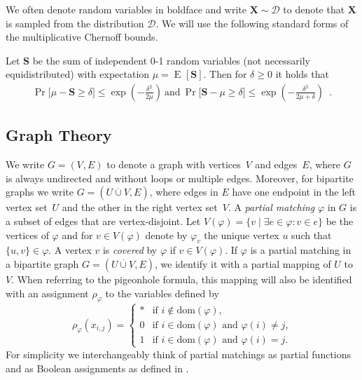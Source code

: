 \documentclass{theoretics}
\DeclareMathOperator{\Expop}{E}
\newcommand{\Prob}[2][]{\Pr_{#1} \bigl[ #2 \bigr]}
\newcommand{\expectation}[2][]{\Expop_{#1} [ #2 ]}
\newcommand{\domainof}[1]{\ensuremath{\mathrm{dom} ( #1 )}}
\newcommand{\set}[1]{\{ #1 \}}
\newcommand{\setdescr}[3][\mid]{\set{ #2 #1 #3 }}
\newcommand{\disjointunion}{\overset{.}{\cup}}
\newcommand{\introduceterm}[1]{{\emph{#1}}}
\newcommand{\eqperiod}{\enspace .}
\newcommand{\V}[1][]{V_{#1}}
\newcommand{\matchbool}[1]{\rho_{#1}}
\newcommand{\matchboolof}[2]{\rho_{#1}(#2)}
\newcommand{\matcha}{\varphi}
\newcommand{\matchaof}[1]{\matcha(#1)}
\newcommand{\Xrand}{\boldsymbol{X}}
\newcommand{\sample}[2]{#1\sim#2}
\numberwithin{equation}{section}
\begin{document}
We often denote random variables in boldface and write
$\sample{\Xrand}{\mathcal{D}}$ to denote that $\Xrand$ is sampled from
the distribution $\mathcal{D}$. We will use the following standard
forms of the multiplicative Chernoff bounds.
\begin{theorem}
  \label{thm:Chernoff}
  Let 
  $\boldsymbol{S}$ 
  be the sum of independent 0-1 random variables 
  (not necessarily equidistributed)
  with expectation $\mu = \expectation{\boldsymbol{S}}$.
  Then for $\delta \geq 0$ it holds that
  \begin{align*}
    \Prob{
    \mu - \boldsymbol{S} \geq \delta
    }
    \leq
      \exp
      \left(
      - \frac{\delta^2}{2\mu}
      \right)~\text{and}~
    \Prob{
    \boldsymbol{S} - \mu \geq \delta
    }
    \leq 
      \exp
      \left(
      - \frac{\delta^2}{2\mu + \delta}
      \right)\eqperiod
  \end{align*}
\end{theorem}

\subsection{Graph Theory}

We write  $G=(\V,E)$ to denote a graph with vertices~$\V$ and
edges~$E$, where $G$ is always undirected and without loops or
multiple edges.
Moreover, 
for bipartite graphs we write
$G = (U \disjointunion V, E)$, where edges in $E$ have one endpoint in
the left vertex set~$U$ and the other in the right vertex set~$V$. 
A \introduceterm{partial matching} $\matcha$ in $G$ is a subset of edges that 
are vertex-disjoint.
Let $V(\matcha) = \setdescr{v}{\exists e \in \matcha: v \in e}$ be the
vertices of $\matcha$ and for $v\in V(\matcha)$ denote by 
$\matcha_v$ the unique vertex $u$
such that $\set{u,v} \in \matcha$. A vertex $v$ 
is \introduceterm{covered} by $\matcha$ if $v \in V(\matcha)$.
If $\matcha$ is a partial matching in a bipartite graph 
$G = (U \disjointunion V, E)$, 
we identify it with a partial mapping of
$U$ to~$V$.
When referring to the pigeonhole formula,
this mapping will also be identified with an assignment
$\matchbool{\matcha}$ to the  
variables defined by
\begin{equation}
  \label{eq:matching-to-assignment}
  \matchboolof{\matcha}{x_{i,j}}
  =
  \begin{cases}
    * 
    & \text{if $i \notin \domainof{\matcha}$,} 
    \\
    0 
    & \text{if $i \in \domainof{\matcha}$ and $\matchaof{i} \neq j$,} 
    \\
    1 
    & \text{if $i \in \domainof{\matcha}$ and $\matchaof{i} = j$.} 
  \end{cases}
\end{equation}
For simplicity we interchangeably think of partial matchings as
partial functions and as Boolean assignments as defined in
.
\end{document}
